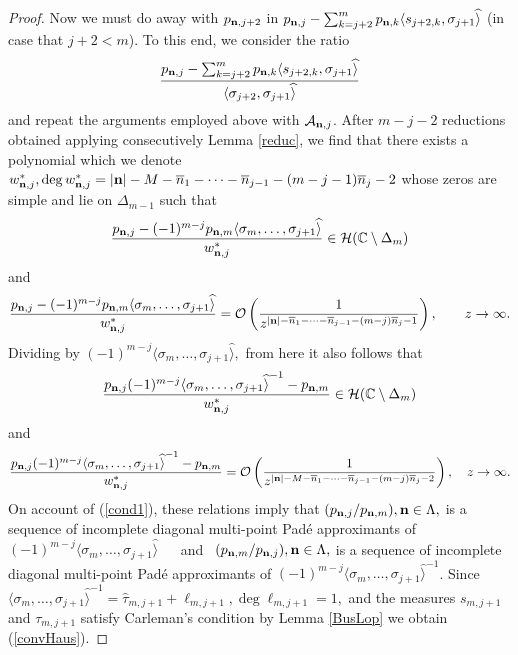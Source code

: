 \documentclass[10pt,a4paper]{article}
\theoremstyle{definition}
\theoremstyle{remark}
\numberwithin{equation}{section}
\begin{document}
\begin{proof}
Now we must do away with $p_{{\bf n},j+2}$ in  $p_{{\bf n},j}  - \sum_{k=j+2}^m p_{{\bf n},k}  \langle s_{j+2,k}, \sigma_{j+1}  \widehat{\rangle}$ (in case that $j+2 < m$). To this end, we consider the ratio
\[ \frac{p_{{\bf n},j}  - \sum_{k=j+2}^m p_{{\bf n},k}  \langle s_{j+2,k}, \sigma_{j+1}  \widehat{\rangle} }{\langle \sigma_{j+2},\sigma_{j+1}\widehat{\rangle}}
\]
and repeat the arguments employed above with $\mathcal{A}_{{\bf n},j}$. After $m-j-2$ reductions obtained applying consecutively Lemma \ref{reduc}, we find that there exists a polynomial which we denote $w_{{\bf n},j}^*, \deg w_{{\bf n},j}^* = |{\bf n}| -M- \overline{n}_1 - \cdots-\overline{n}_{j-1}-(m-j-1)\overline{n}_{j} -2$ whose zeros are simple and lie on $\Delta_{m-1}$ such that
\[ \frac{p_{{\bf n},j} - (-1)^{m-j} p_{{\bf n},m} \langle \sigma_{m},\ldots, \sigma_{j+1} \widehat{\rangle}}{w_{{\bf n},j}^*} \in \mathcal{H}(\mathbb{C} \setminus \Delta_m)
\]
and
\[ \frac{p_{{\bf n},j}- (-1)^{m-j} p_{{\bf n},m} \langle \sigma_{m},\ldots, \sigma_{j+1} \widehat{\rangle}}{w_{{\bf n},j}^*}  = \mathcal{O}\left(\frac{1}{z^{{|{\bf n}| - \overline{n}_1 - \cdots-\overline{n}_{j-1}-(m-j)\overline{n}_{j}-1}}}\right), \qquad z\to \infty.
\]
Dividing by $(-1)^{m-j}  \langle \sigma_{m},\ldots, \sigma_{j+1} \widehat{\rangle},$ from here it also follows that
\[ \frac{p_{{\bf n},j}(-1)^{m-j}\langle \sigma_{m},\ldots, \sigma_{j+1} \widehat{\rangle}^{-1} -  p_{{\bf n},m} }{w_{{\bf n},j}^*} \in \mathcal{H}(\mathbb{C} \setminus \Delta_m)
\]
and
\[ \frac{p_{{\bf n},j}(-1)^{m-j}\langle \sigma_{m},\ldots, \sigma_{j+1} \widehat{\rangle}^{-1}- p_{{\bf n},m} }{w_{{\bf n},j}^*}  = \mathcal{O}\left(\frac{1}{z^{{|{\bf n}| - M-\overline{n}_1 - \cdots-\overline{n}_{j-1}-(m-j)\overline{n}_{j}-2}}}\right), \quad z\to \infty.
\]
On account of (\ref{cond1}), these relations imply that $(p_{{\bf n},j}/p_{{\bf n},m}), {\bf n} \in \Lambda,$ is a sequence of incomplete diagonal multi-point Pad\'e approximants of
$(-1)^{m-j}\langle \sigma_{m},\ldots, \sigma_{j+1} \widehat{\rangle}\phantom{ert}$ and $\phantom{e} (p_{{\bf n},m}/p_{{\bf n},j}),  {\bf n} \in \Lambda,$ is a sequence of incomplete diagonal multi-point Pad\'e approximants of $(-1)^{m-j}\langle \sigma_{m},\ldots, \sigma_{j+1} \widehat{\rangle}^{-1}$. Since $\langle \sigma_{m},\ldots, \sigma_{j+1} \widehat{\rangle}^{-1} = \widehat{\tau}_{m,j+1} + \ell_{m,j+1}, \deg \ell_{m,j+1} = 1,$ and the measures $s_{m,j+1}$ and $\tau_{m,j+1}$ satisfy Carleman's condition by Lemma \ref{BusLop} we obtain (\ref{convHaus}).
\end{proof}
\end{document}
